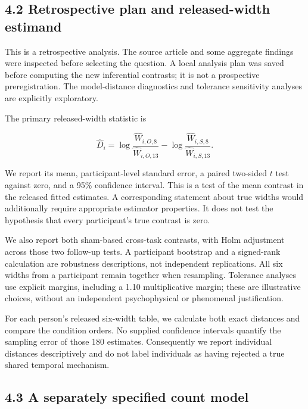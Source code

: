 \documentclass[
  11pt,
]{article}
\let\ctdoldsubsection\subsection
\renewcommand{\subsection}{\Needspace{6\baselineskip}\ctdoldsubsection}
\begin{document}
\hypertarget{retrospective-plan-and-released-width-estimand}{%
\subsection{4.2 Retrospective plan and released-width
estimand}\label{retrospective-plan-and-released-width-estimand}}

This is a retrospective analysis. The source article and some aggregate
findings were inspected before selecting the question. A local analysis
plan was saved before computing the new inferential contrasts; it is not
a prospective preregistration. The model-distance diagnostics and
tolerance sensitivity analyses are explicitly exploratory.

The primary released-width statistic is

\[
\widehat D_i
=\log\frac{\widehat W_{i,O,8}}{\widehat W_{i,O,13}}
-\log\frac{\widehat W_{i,S,8}}{\widehat W_{i,S,13}}.
\]

We report its mean, participant-level standard error, a paired two-sided
\(t\) test against zero, and a 95\% confidence interval. This is a test
of the mean contrast in the released fitted estimates. A corresponding
statement about true widths would additionally require appropriate
estimator properties. It does not test the hypothesis that every
participant's true contrast is zero.

We also report both sham-based cross-task contrasts, with Holm
adjustment across those two follow-up tests. A participant bootstrap and
a signed-rank calculation are robustness descriptions, not independent
replications. All six widths from a participant remain together when
resampling. Tolerance analyses use explicit margins, including a 1.10
multiplicative margin; these are illustrative choices, without an
independent psychophysical or phenomenal justification.

For each person's released six-width table, we calculate both exact
distances and compare the condition orders. No supplied confidence
intervals quantify the sampling error of those 180 estimates.
Consequently we report individual distances descriptively and do not
label individuals as having rejected a true shared temporal mechanism.

\hypertarget{a-separately-specified-count-model}{%
\subsection{4.3 A separately specified count
model}\label{a-separately-specified-count-model}}
\end{document}
